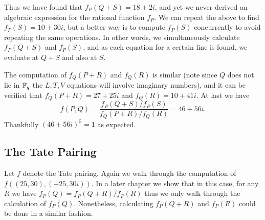 Thus we have found that $f_P(Q+S) = 18+2i$, and yet we never derived
an algebraic expression for the rational function $f_P$.
We can repeat the above to find $f_P(S) = 10 + 30i$, but a better way
is to compute $f_P(S)$ concurrently to avoid repeating the same operations.
In other words, we simultaneously calculate $f_P(Q+S)$ and $f_P(S)$, and
as each equation for a certain line is found,
we evaluate at $Q+S$ and also at $S$.

The computation of $f_Q(P+R)$ and $f_Q(R)$ is similar (note since
$Q$ does not lie in $\mathbb{F}_q$ the $L,T,V$ equations will involve imaginary
numbers), and it can be verified that
$f_Q(P+R) = 27+25i$ and $f_Q(R)=10+41i$.
At last we have
\[
f(P,Q) = \frac{f_P(Q+S)/f_P(S)}{f_Q(P+R)/f_Q(R)} = 46+56i .
\] Thankfully $(46+56i)^5 = 1$ as expected.

\subsection {The Tate Pairing}

Let $f$ denote the Tate pairing. Again we walk through the computation of
$f((25,30), (-25,30i))$. In a later chapter we show that in this case, for any
$R$ we have $f_P(Q) = f_P(Q+R)/f_P(R)$ thus we only walk through the
calculation of $f_P(Q)$. Nonetheless, calculating $f_P(Q+R)$ and $f_P(R)$ could
be done in a similar fashion.

